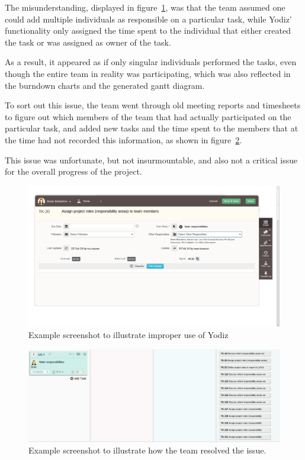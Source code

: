 The misunderstanding, displayed in figure~\ref{fig:wrongUse}, was that the team
assumed one could add multiple individuals as responsible on a particular task,
while Yodiz' functionality only assigned the time spent to the individual that
either created the task or was assigned as owner of the task.

As a result, it appeared as if only singular individuals performed the tasks,
even though the entire team in reality was participating, which was also
reflected in the burndown charts and the generated gantt diagram. 

To sort out this issue, the team went through old meeting reports and timesheets
to figure out which members of the team that had actually participated on the
particular task, and added new tasks and the time spent to the members that at
the time had not recorded this information, as shown in
figure~\ref{fig:addsTasks}.

This issue was unfortunate, but not insurmountable, and also not a critical
issue for the overall progress of the project.

\begin{figure}[H]
\includegraphics[width=\textwidth]{ch/devProcess/fig/wrongUse.png}
\caption{Example screenshot to illustrate improper use of Yodiz}
\label{fig:wrongUse}
\end{figure}

\begin{figure}[H]
\includegraphics[width=\textwidth]{ch/devProcess/fig/addsTasks.png}
\caption{Example screenshot to illustrate how the team resolved the issue.}
\label{fig:addsTasks}
\end{figure}


